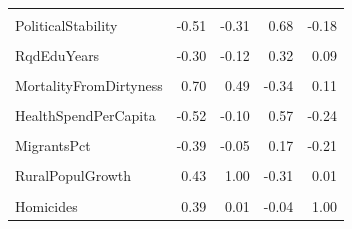 \documentclass[
]{article}
\begin{document}
\begin{table}
{\begin{tabular}[t]{lrrrr}
\cellcolor{gray!10}{InternetUsersPct} & \cellcolor{gray!10}{-0.77} & \cellcolor{gray!10}{-0.16} & \cellcolor{gray!10}{0.44} & \cellcolor{gray!10}{-0.20}\\
\addlinespace
PoliticalStability & -0.51 & -0.31 & 0.68 & -0.18\\
\cellcolor{gray!10}{RuleOfLaw} & \cellcolor{gray!10}{-0.68} & \cellcolor{gray!10}{-0.31} & \cellcolor{gray!10}{0.82} & \cellcolor{gray!10}{-0.31}\\
RqdEduYears & -0.30 & -0.12 & 0.32 & 0.09\\
\cellcolor{gray!10}{GovtEduSpendPctGDP} & \cellcolor{gray!10}{-0.22} & \cellcolor{gray!10}{-0.08} & \cellcolor{gray!10}{0.31} & \cellcolor{gray!10}{-0.04}\\
MortalityFromDirtyness & 0.70 & 0.49 & -0.34 & 0.11\\
\addlinespace
\cellcolor{gray!10}{UHCServiceCoverage} & \cellcolor{gray!10}{-0.79} & \cellcolor{gray!10}{-0.46} & \cellcolor{gray!10}{0.50} & \cellcolor{gray!10}{-0.07}\\
HealthSpendPerCapita & -0.52 & -0.10 & 0.57 & -0.24\\
\cellcolor{gray!10}{GovtHealthSpendPerCapita} & \cellcolor{gray!10}{-0.53} & \cellcolor{gray!10}{-0.11} & \cellcolor{gray!10}{0.56} & \cellcolor{gray!10}{-0.26}\\
MigrantsPct & -0.39 & -0.05 & 0.17 & -0.21\\
\cellcolor{gray!10}{FoodInsecurityPct} & \cellcolor{gray!10}{1.00} & \cellcolor{gray!10}{0.43} & \cellcolor{gray!10}{-0.54} & \cellcolor{gray!10}{0.39}\\
\addlinespace
RuralPopulGrowth & 0.43 & 1.00 & -0.31 & 0.01\\
\cellcolor{gray!10}{VoiceAccountability} & \cellcolor{gray!10}{-0.54} & \cellcolor{gray!10}{-0.31} & \cellcolor{gray!10}{1.00} & \cellcolor{gray!10}{-0.04}\\
Homicides & 0.39 & 0.01 & -0.04 & 1.00\\
\bottomrule
\end{tabular}}
\end{table}
\end{document}
